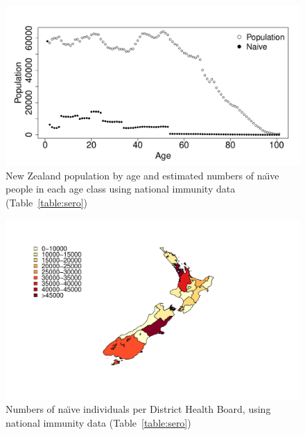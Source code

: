 \documentclass{article}
\begin{document}
\begin{itemize}
\begin{figure}
\begin{center}
\includegraphics{draftfinalreport-023}
\end{center}
\caption{New Zealand population by age and estimated numbers of na\"{\i}ve people in each age class using national immunity data (Table~\ref{table:sero})}
\label{fig:naive}
\end{figure}

\begin{figure}[H]
     \begin{center}
     \includegraphics[width=1.2\textwidth]{naive_map.pdf}
     \end{center}
     \caption{Numbers of na\"{\i}ve individuals per District Health Board, using national immunity data (Table~\ref{table:sero})}
     \label{fig:naive_map}
\end{figure}


\end{itemize}
\end{document}
